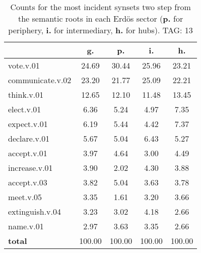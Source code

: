 \begin{table}[h!]
\begin{center}
\begin{tabular}{| l | c | c | c | c |}\hline
 & g. & p. & i. & h. \\\hline
vote.v.01 & 24.69  & 30.44  & 25.96  & 23.21 \\\hline
communicate.v.02 & 23.20  & 21.77  & 25.09  & 22.21 \\\hline
think.v.01 & 12.65  & 12.10  & 11.48  & 13.45 \\\hline
elect.v.01 & 6.36  & 5.24  & 4.97  & 7.35 \\\hline
expect.v.01 & 6.19  & 5.44  & 4.42  & 7.37 \\\hline
declare.v.01 & 5.67  & 5.04  & 6.43  & 5.27 \\\hline
accept.v.01 & 3.97  & 4.64  & 3.00  & 4.49 \\\hline
increase.v.01 & 3.90  & 2.02  & 4.30  & 3.88 \\\hline
accept.v.03 & 3.82  & 5.04  & 3.63  & 3.78 \\\hline
meet.v.05 & 3.35  & 1.61  & 3.20  & 3.66 \\\hline
extinguish.v.04 & 3.23  & 3.02  & 4.18  & 2.66 \\\hline
name.v.01 & 2.97  & 3.63  & 3.35  & 2.66 \\\hline
{{\bf total}} & 100.00  & 100.00  & 100.00  & 100.00 \\\hline
\end{tabular}
\caption{Counts for the most incident synsets two step from the semantic roots in each Erd\"os sector ({\bf p.} for periphery, {\bf i.} for intermediary, {\bf h.} for hubs). TAG: 13}
\end{center}
\end{table}